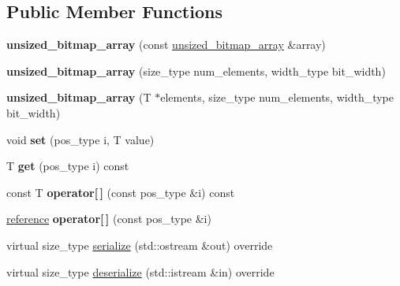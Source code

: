 \subsection*{Public Member Functions}
\begin{DoxyCompactItemize}
\item 
\mbox{\label{classdialog_1_1unsized__bitmap__array_a940998b89b7e061c39ea8720aa7b3b61}} 
{\bfseries unsized\+\_\+bitmap\+\_\+array} (const \hyperlink{classdialog_1_1unsized__bitmap__array}{unsized\+\_\+bitmap\+\_\+array} \&array)
\item 
\mbox{\label{classdialog_1_1unsized__bitmap__array_a849b479fd6e8c67ed680695d04f4cac0}} 
{\bfseries unsized\+\_\+bitmap\+\_\+array} (size\+\_\+type num\+\_\+elements, width\+\_\+type bit\+\_\+width)
\item 
\mbox{\label{classdialog_1_1unsized__bitmap__array_a2c7c8fa9c04b92259ce3fa1630fdd4f2}} 
{\bfseries unsized\+\_\+bitmap\+\_\+array} (T $\ast$elements, size\+\_\+type num\+\_\+elements, width\+\_\+type bit\+\_\+width)
\item 
\mbox{\label{classdialog_1_1unsized__bitmap__array_aad12c309b1d637d8c0a25546098cf717}} 
void {\bfseries set} (pos\+\_\+type i, T value)
\item 
\mbox{\label{classdialog_1_1unsized__bitmap__array_ac9dfbc9c10483e0f4d4943a0516a5f08}} 
T {\bfseries get} (pos\+\_\+type i) const
\item 
\mbox{\label{classdialog_1_1unsized__bitmap__array_a783d5378e0f0aa1e10c10f0108feefd0}} 
const T {\bfseries operator\mbox{[}$\,$\mbox{]}} (const pos\+\_\+type \&i) const
\item 
\mbox{\label{classdialog_1_1unsized__bitmap__array_ac3a92dbcf24be1eab76efcb3a5dd8d3a}} 
\hyperlink{classdialog_1_1value__reference}{reference} {\bfseries operator\mbox{[}$\,$\mbox{]}} (const pos\+\_\+type \&i)
\item 
virtual size\+\_\+type \hyperlink{classdialog_1_1unsized__bitmap__array_a3c6dfec187c0ecad49d562c2b081ec6a}{serialize} (std\+::ostream \&out) override
\item 
virtual size\+\_\+type \hyperlink{classdialog_1_1unsized__bitmap__array_a4ae9d743033be4468f4c0be8dbaccbca}{deserialize} (std\+::istream \&in) override
\end{DoxyCompactItemize}
